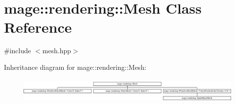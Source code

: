 \hypertarget{classmage_1_1rendering_1_1_mesh}{}\section{mage\+:\+:rendering\+:\+:Mesh Class Reference}
\label{classmage_1_1rendering_1_1_mesh}


{\ttfamily \#include $<$mesh.\+hpp$>$}

Inheritance diagram for mage\+:\+:rendering\+:\+:Mesh\+:\begin{figure}[H]
\begin{center}
\leavevmode
\includegraphics[height=1.281464cm]{classmage_1_1rendering_1_1_mesh}
\end{center}
\end{figure}
